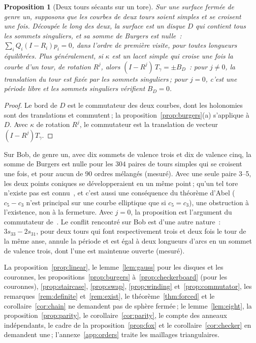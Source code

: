 \documentclass[11pt,a4paper]{article}
\newtheorem{proposition}{Proposition}
\newcommand{\shift}{s}
\newcommand{\lean}[1]{\texttt{\detokenize{#1}}}
\newenvironment{evidence}[3][]{}{}
\begin{document}
\begin{evidence}{core}{\lean{commutator_translation}, \lean{commutator_translations}\,; supposé~: le bord du disque découpé est le commutateur des deux courbes}
\begin{proposition}[Deux tours sécants sur un tore]\label{prop:torus}
Sur une surface fermée de genre un, supposons que les courbes de deux tours
soient simples et se croisent une fois. Découpée le long des deux, la surface
est un disque $D$ qui contient tous les sommets singuliers, et sa somme de
Burgers est nulle~: $\sum_i Q_i (I - R_i) p_i = 0$, dans l'ordre de première
visite, pour toutes longueurs équilibrées. Plus généralement, si $\kappa$ est
un lacet simple qui croise une fois la courbe d'un tour, de rotation $R^j$,
alors $(I - R^j)\,T_\gamma = \pm B_D$~: pour $j \neq 0$, la translation du
tour est fixée par les sommets singuliers\,; pour $j = 0$, c'est une période
libre et les sommets singuliers vérifient $B_D = 0$.
\end{proposition}
\end{evidence}
\begin{proof}
Le bord de $D$ est le commutateur des deux courbes, dont les holonomies sont
des translations et commutent\,; la proposition~\ref{prop:burgers}(a)
s'applique à $D$. Avec $\kappa$ de rotation $R^j$, le commutateur est la
translation de vecteur $(I - R^j)T_\gamma$.
\end{proof}

Sur Bob, de genre un, avec dix sommets de valence trois et dix de valence
cinq, la somme de Burgers est nulle pour les $304$ paires de tours simples qui
se croisent une fois, et pour aucun de $90$ ordres mélangés (mesuré). Avec une
seule paire 3--5, les deux points coniques se développeraient en un même
point\,; qu'un tel tore n'existe pas est connu~\cite{izmestiev2013torus}, et
c'est aussi une conséquence du théorème d'Abel
($c_5 - c_3$ n'est principal sur une courbe elliptique que si $c_5 = c_3$),
une obstruction à l'existence, non à la fermeture. Avec $j = 0$, la
proposition est l'argument du commutateur de~\cite[\S7]{izmestiev2013torus}.
Le conflit rencontré sur Bob est d'une autre nature~: $3\shift_{33} -
2\shift_{31}$, pour deux tours qui font respectivement trois et deux fois le
tour de la même anse, annule la période et est égal à deux longueurs d'arcs en
un sommet de valence trois, dont l'une est maintenue ouverte (mesuré).

La proposition~\ref{prop:linear}, le lemme~\ref{lem:gauss} pour les disques et
les couronnes, les propositions~\ref{prop:burgers} à~\ref{prop:checkerboard}
(pour les couronnes), \ref{prop:staircase}, \ref{prop:swap},
\ref{prop:winding} et~\ref{prop:commutator}, les
remarques~\ref{rem:definite} et~\ref{rem:exist}, le
théorème~\ref{thm:forced} et le corollaire~\ref{cor:chain} ne demandent pas de
sphère fermée\,; le lemme~\ref{lem:eight}, la proposition~\ref{prop:parity},
le corollaire~\ref{cor:parity}, le compte des anneaux indépendants, le cadre
de la proposition~\ref{prop:fox} et le corollaire~\ref{cor:checker} en
demandent une\,; l'annexe~\ref{app:orders} traite
les maillages triangulaires.
\end{document}
